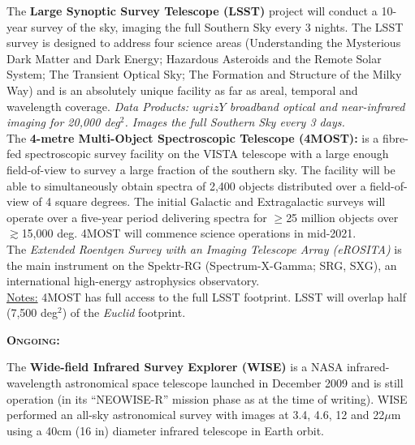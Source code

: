 \begin{framed}
The {\bf Large Synoptic Survey Telescope (LSST)} project will conduct
a 10-year survey of the sky, imaging the full Southern Sky every 3
nights. The LSST survey is designed to address four science areas
(Understanding the Mysterious Dark Matter and Dark Energy; Hazardous
Asteroids and the Remote Solar System; The Transient Optical Sky; The
Formation and Structure of the Milky Way) and is an absolutely unique
facility as far as areal, temporal and wavelength coverage.  {\it Data
Products: $ugrizY$ broadband optical and near-infrared imaging for
20,000 deg$^2$.  Images the full Southern Sky every 3 days.} \\

The {\bf 4-metre Multi-Object Spectroscopic Telescope (4MOST):} is a
fibre-fed spectroscopic survey facility on the VISTA telescope with a
large enough field-of-view to survey a large fraction of the southern
sky. The facility will be able to simultaneously obtain spectra of
2,400 objects distributed over a field-of-view of 4 square degrees.
The initial Galactic and Extragalactic surveys will operate over a
five-year period delivering spectra for $\geq$25 million objects over
$\gtrsim$15,000 deg. 4MOST will commence science operations in
mid-2021. \\ 

The {\it Extended Roentgen Survey with an Imaging Telescope Array
(eROSITA)} is the main instrument on the Spektr-RG (Spectrum-X-Gamma;
SRG, SXG), an international high-energy astrophysics observatory. \\

\underline{Notes:} 4MOST has full access to the full LSST
footprint. LSST will overlap half (7,500 deg$^2$) of the {\it Euclid}
footprint. \\

\hrulefill 

\noindent
\textbf{\textsc{Ongoing:}} 

The {\bf Wide-field Infrared Survey Explorer (WISE)} is a NASA
infrared-wavelength astronomical space telescope launched in December
2009 and is still operation (in its ``NEOWISE-R'' mission phase as at
the time of writing). WISE performed an all-sky astronomical survey
with images at 3.4, 4.6, 12 and 22$\mu$m using a 40cm (16 in) diameter
infrared telescope in Earth orbit. \\


\end{framed}
